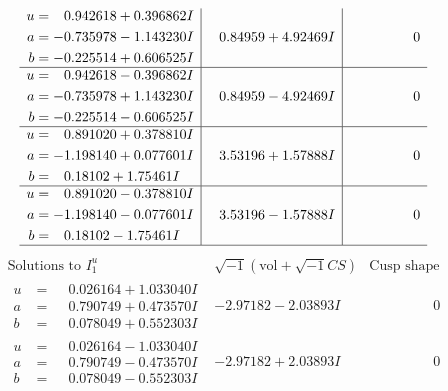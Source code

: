 \documentclass[1p]{elsarticle_modified}
\theoremstyle{definition}
\newcommand{\I}{\sqrt{-1}}
\begin{document}
$$\begin{array}{c|c|c}
\begin{aligned}
u &= \phantom{-}0.942618 + 0.396862 I \\
a &= -0.735978 - 1.143230 I \\
b &= -0.225514 + 0.606525 I\end{aligned}
 & \phantom{-}0.84959 + 4.92469 I & \phantom{-0.000000 } 0 \\ \hline\begin{aligned}
u &= \phantom{-}0.942618 - 0.396862 I \\
a &= -0.735978 + 1.143230 I \\
b &= -0.225514 - 0.606525 I\end{aligned}
 & \phantom{-}0.84959 - 4.92469 I & \phantom{-0.000000 } 0 \\ \hline\begin{aligned}
u &= \phantom{-}0.891020 + 0.378810 I \\
a &= -1.198140 + 0.077601 I \\
b &= \phantom{-}0.18102 + 1.75461 I\end{aligned}
 & \phantom{-}3.53196 + 1.57888 I & \phantom{-0.000000 } 0 \\ \hline\begin{aligned}
u &= \phantom{-}0.891020 - 0.378810 I \\
a &= -1.198140 - 0.077601 I \\
b &= \phantom{-}0.18102 - 1.75461 I\end{aligned}
 & \phantom{-}3.53196 - 1.57888 I & \phantom{-0.000000 } 0\\
 \hline 
 \end{array}$$\newpage$$\begin{array}{c|c|c}  
\text{Solutions to }I^u_{1}& \I (\text{vol} + \sqrt{-1}CS) & \text{Cusp shape}\\
 \hline 
\begin{aligned}
u &= \phantom{-}0.026164 + 1.033040 I \\
a &= \phantom{-}0.790749 + 0.473570 I \\
b &= \phantom{-}0.078049 + 0.552303 I\end{aligned}
 & -2.97182 - 2.03893 I & \phantom{-0.000000 } 0 \\ \hline\begin{aligned}
u &= \phantom{-}0.026164 - 1.033040 I \\
a &= \phantom{-}0.790749 - 0.473570 I \\
b &= \phantom{-}0.078049 - 0.552303 I\end{aligned}
 & -2.97182 + 2.03893 I & \phantom{-0.000000 } 0 \\ \hline\begin{aligned}

\end{aligned}
\end{array}$$
\end{document}
